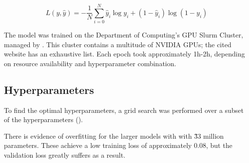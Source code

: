 \begin{equation}\label{bceEq}
  L(y, \hat{y}) = -\frac{1}{N}\sum_{i=0}^N \hat{y}_i \log y_i +
    (1-\hat{y}_i)\log(1-y_i)
\end{equation}

The model was trained on the Department of Computing's GPU Slurm Cluster,
managed by \citet{csgGPU}. This cluster contains a multitude of NVIDIA GPUs;
the cited website has an exhaustive list. Each epoch took approximately 1h-2h,
depending on resource availability and hyperparameter combination.

\subsection{Hyperparameters}\label{mlS22}

To find the optimal hyperparameters, a grid search was performed over a subset
of the hyperparameters (). 

There is evidence of overfitting for the larger models with with \~33 million
parameters. These achieve a low training loss of approximately 0.08, but the
validation loss greatly suffers as a result.


